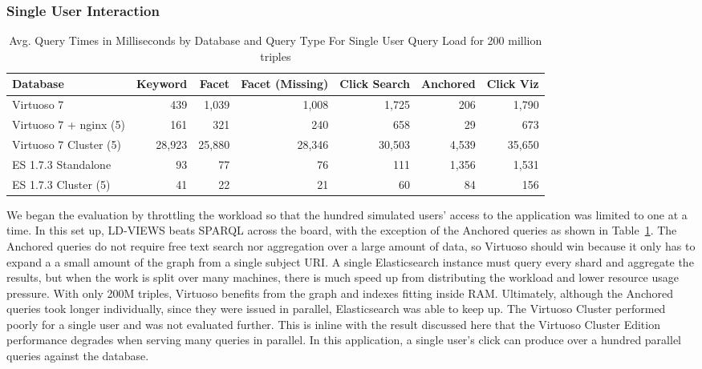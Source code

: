 \subsubsection{Single User Interaction}
 \begin{table}
 \centering
 \scriptsize{
    \begin{tabular}{ l||r|r|r|r|r|r }
        Database & Keyword & Facet & Facet (Missing) & Click Search & Anchored & Click Viz \\ \hline 
        Virtuoso 7 & 439 & 1,039 & 1,008 & 1,725 & 206 &  1,790 \\ 
        Virtuoso 7 + nginx (5) & 161 & 321 & 240 & 658 & 29 &  673 \\ 
        Virtuoso 7 Cluster (5) & 28,923 & 25,880 & 28,346 & 30,503 & 4,539 & 35,650\\
        ES 1.7.3 Standalone & 93 & 77 & 76 & 111 & 1,356 & 1,531 \\ 
        ES 1.7.3 Cluster (5) & 41 & 22 & 21 & 60 & 84 & 156 \\ 
    \end{tabular} 
    }
    \centering
    \caption{Avg. Query Times in Milliseconds by Database and Query Type For Single User Query Load for 200 million triples}
    \label{table:qt_single_user_200m}
    \vspace{-0.2cm}
\end{table}
We began the evaluation by throttling the workload so that the hundred simulated users' access to the application was limited to one at a time.
In this set up, LD-VIEWS beats SPARQL across the board, with the exception of the Anchored queries as shown in Table~\ref{table:qt_single_user_200m}.  
The Anchored queries do not require free text search nor aggregation over a large amount of data, so Virtuoso should win because it only has to expand a a small amount of the graph from a single subject URI.
A single Elasticsearch instance must query every shard and aggregate the results, but when the work is split over many machines, there is much speed up from distributing the workload and lower resource usage pressure.   
With only 200M triples, Virtuoso benefits from the graph and indexes fitting inside RAM.
Ultimately, although the Anchored queries took longer individually, since they were issued in parallel, Elasticsearch was able to keep up.
The Virtuoso Cluster performed poorly for a single user and was not evaluated further. 
This is inline with the result discussed here \cite{harthlinked} that the Virtuoso Cluster Edition performance degrades when serving many queries in parallel.  
In this application, a single user's click can produce over a hundred parallel queries against the database. 

